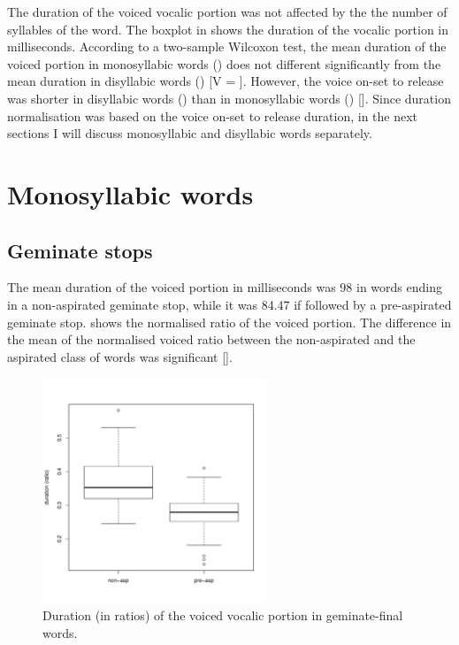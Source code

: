 \documentclass[11pt,a4paper,openany]{memoir}\usepackage[]{graphicx}\usepackage[]{color}
\newenvironment{knitrout}{}{} %
\begin{document}
The duration of the voiced vocalic portion was not affected by the the number of syllables of the word.
The boxplot in  shows the duration of the vocalic portion in milliseconds.
According to a two-sample Wilcoxon test, the mean duration of the voiced portion in monosyllabic words () does not different significantly from the mean duration in disyllabic words () [V = ].
However, the voice on-set to release was shorter in disyllabic words () than in monosyllabic words () [].
Since duration normalisation was based on the voice on-set to release duration, in the next sections I will discuss monosyllabic and disyllabic words separately.

\section{Monosyllabic words}

\subsection{Geminate stops}



The mean duration of the voiced portion in milliseconds was 98 in words ending in a non-aspirated geminate stop, while it was 84.47 if followed by a pre-aspirated geminate stop.
 shows the normalised ratio of the voiced portion.
The difference in the mean of the normalised voiced ratio between the non-aspirated and the aspirated class of words was significant [].

\begin{figure}
\centering
\begin{knitrout}
\color{fgcolor}
\includegraphics[width=0.6\textwidth]{img/mono-stop-box-1} 

\end{knitrout}
\caption{Duration (in ratios) of the voiced vocalic portion in geminate-final words.}
\label{f:monostop}
\end{figure}
\end{document}
